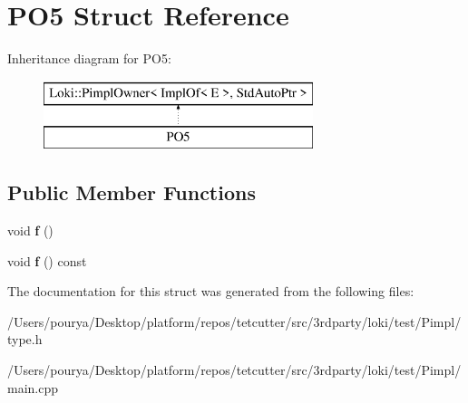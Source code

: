 \hypertarget{structPO5}{}\section{P\+O5 Struct Reference}
\label{structPO5}
Inheritance diagram for P\+O5\+:\begin{figure}[H]
\begin{center}
\leavevmode
\includegraphics[height=2.000000cm]{structPO5}
\end{center}
\end{figure}
\subsection*{Public Member Functions}
\begin{DoxyCompactItemize}
\item 
\hypertarget{structPO5_a94220ceacaa0c169756b13ed59d96556}{}void {\bfseries f} ()\label{structPO5_a94220ceacaa0c169756b13ed59d96556}

\item 
\hypertarget{structPO5_ab4727331e594cfc8314d299f7a32d540}{}void {\bfseries f} () const \label{structPO5_ab4727331e594cfc8314d299f7a32d540}

\end{DoxyCompactItemize}


The documentation for this struct was generated from the following files\+:\begin{DoxyCompactItemize}
\item 
/\+Users/pourya/\+Desktop/platform/repos/tetcutter/src/3rdparty/loki/test/\+Pimpl/type.\+h\item 
/\+Users/pourya/\+Desktop/platform/repos/tetcutter/src/3rdparty/loki/test/\+Pimpl/main.\+cpp\end{DoxyCompactItemize}
